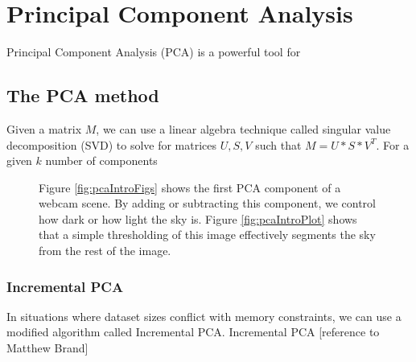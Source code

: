 %
\chapter{Principal Component Analysis}
\label{cpt:pca}

Principal Component Analysis (PCA) is a powerful tool for 

\section{The PCA method}

Given a matrix $M$, we can use a linear algebra technique called singular value decomposition (SVD) to solve for matrices $U, S, V$ such that $M = U * S * V^T.$  For a given $k$ number of components


\begin{figure}[ht]
	\centering
		\caption[Learning a sky mask for a webcam scene.]{Figure \ref{fig:pcaIntroFigs} shows the first PCA component of a webcam scene.  By adding or subtracting this component, we control how dark or how light the sky is. Figure \ref{fig:pcaIntroPlot} shows that a simple thresholding of this image effectively segments the sky from the rest of the image.}
\end{figure}

\subsection{Incremental PCA}

In situations where dataset sizes conflict with memory constraints, we can use a modified algorithm called Incremental PCA.  Incremental PCA [reference to Matthew Brand]